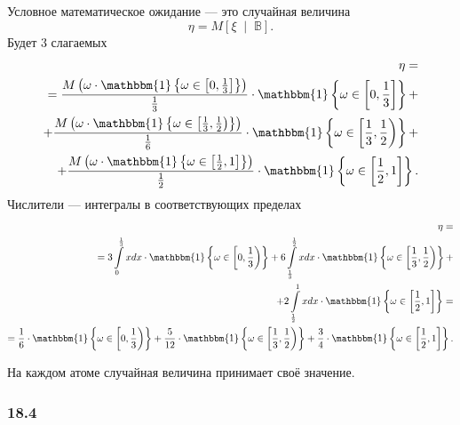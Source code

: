 Условное математическое ожидание ---
это случайная величина
$$ \eta =
  M \left[ \xi \; \middle| \; \mathbb{B} \right].$$
Будет 3 слагаемых
\begin{equation*}
  \begin{split}
    \eta = \\
    = \frac{M \left( \omega \cdot \mathbbm{1} \left\{ \omega \in \left[ 0, \frac{1}{3} \right] \right\} \right) }{ \frac{1}{3}} \cdot
    \mathbbm{1} \left\{ \omega \in \left[ 0, \frac{1}{3} \right] \right\} + \\
    + \frac{M \left( \omega \cdot \mathbbm{1} \left\{ \omega \in \left[ \frac{1}{3}, \frac{1}{2} \right) \right\} \right) }{ \frac{1}{6}} \cdot
    \mathbbm{1} \left\{ \omega \in \left[ \frac{1}{3}, \frac{1}{2} \right) \right\} + \\
    + \frac{M \left( \omega \cdot \mathbbm{1} \left\{ \omega \in \left[ \frac{1}{2}, 1 \right] \right\} \right) }{ \frac{1}{2}} \cdot
    \mathbbm{1} \left\{ \omega \in \left[ \frac{1}{2}, 1 \right] \right\}.
  \end{split}
\end{equation*}
Числители --- интегралы в соответствующих пределах
\begin{equation*}
  \begin{split}
    \eta = \\
    = 3 \int \limits_0^{ \frac{1}{3}} xdx \cdot
    \mathbbm{1} \left\{ \omega \in \left[ 0, \frac{1}{3} \right) \right\} +
    6 \int \limits_{ \frac{1}{3}}^{ \frac{1}{2}} xdx \cdot
    \mathbbm{1} \left\{ \omega \in \left[ \frac{1}{3}, \frac{1}{2} \right) \right\} + \\
    + 2 \int \limits_{ \frac{1}{2}}^1 xdx \cdot
    \mathbbm{1} \left\{ \omega \in \left[ \frac{1}{2}, 1 \right] \right\} = \\
    = \frac{1}{6} \cdot \mathbbm{1} \left\{ \omega \in \left[ 0, \frac{1}{3} \right) \right\} +
    \frac{5}{12} \cdot
    \mathbbm{1} \left\{ \omega \in \left[ \frac{1}{3}, \frac{1}{2} \right) \right\} +
    \frac{3}{4} \cdot \mathbbm{1} \left\{ \omega \in \left[ \frac{1}{2}, 1 \right] \right\}.
  \end{split}
\end{equation*}

На каждом атоме случайная величина принимает своё значение.

\subsubsection*{18.4}

